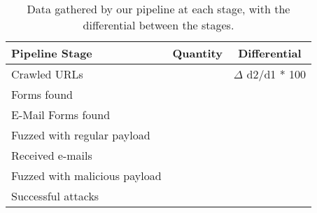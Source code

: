 \begin{table}[tbp]
	\centering
	\scriptsize
	\begin{tabular}{|l|c|c|}
		\hline
		\textbf{Pipeline Stage} & \textbf{Quantity} & \textbf{Differential}\\
		\hline
		Crawled URLs  & \urls & $\Delta$ d2/d1 * 100 \\
		\hline
		Forms found  & \forms & \formsDelta \\
		\hline
		E-Mail Forms found  & \emailforms & \emailformsDelta \\
		\hline
		Fuzzed with regular payload  & \fuzzed & \fuzzedDelta \\
		\hline
		Received e-mails  & \recd & \recdDelta \\
		\hline
		Fuzzed with malicious payload  & \malfuzzed & \malfuzzedDelta \\
		\hline
		Successful attacks  & \success & \successDelta \\
		\hline

	\end{tabular}
	\caption[]{Data gathered by our pipeline at each stage, with the differential between the stages.}
	\label{tab:pipeline}
\end{table}
